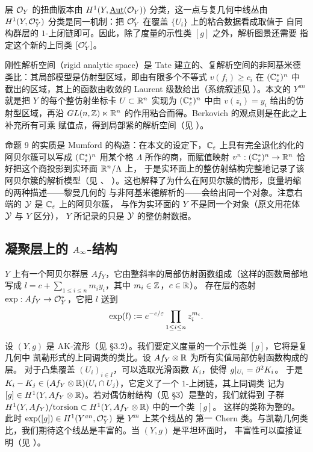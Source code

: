 \begin{yizhu}[扭曲层与第一非阿贝尔上同调]
层 $\mathcal{O}_Y$ 的扭曲版本由 $H^1(Y,\underline{\operatorname{Aut}}(\mathcal{O}_Y))$ 分类，这一点与复几何中线丛由
$H^1(Y,\mathcal{O}_Y^*)$ 分类是同一机制：把 $\mathcal{O}'_Y$ 在覆盖 $\{U_i\}$ 上的粘合数据看成取值于
自同构群层的 $1$-上闭链即可。因此，除了度量的示性类 $[g]$ 之外，解析图景还需要
指定这个新的上同类 $[\mathcal{O}'_Y]$。
\end{yizhu}

\begin{yizhu}[刚性解析空间与赋值]
刚性解析空间（rigid analytic space）是 Tate 建立的、复解析空间的非阿基米德
类比：其局部模型是仿射型区域，即由有限多个不等式 $v(f_i)\ge c_i$ 在
$(\mathbb{C}_{\varepsilon}^*)^n$ 中截出的区域，其上的函数由收敛的 Laurent 级数给出（系统叙述见
\cite{BGR}）。本文的 $Y^{an}$ 就是把 $Y$ 的每个整仿射坐标卡 $U\subset\mathbb{R}^n$ 实现为
$(\mathbb{C}_{\varepsilon}^*)^n$ 中由 $v(z_i)=y_i$ 给出的仿射型区域，再沿
$GL(n,\mathbb{Z})\ltimes\mathbb{R}^n$ 的作用粘合而得。Berkovich 的观点则是在此之上补充所有可乘
赋值点，得到局部紧的解析空间（见 \cite{Be}）。
\end{yizhu}

\begin{yizhu}[命题 9 的含义]
命题 9 的实质是 Mumford 的构造：在本文的设定下，$\mathbb{C}_{\varepsilon}$ 上具有完全退化约化的
阿贝尔簇可以写成 $(\mathbb{C}_{\varepsilon}^*)^n$ 用某个格 $\Lambda$ 所作的商，而赋值映射
$v^n:(\mathbb{C}_{\varepsilon}^*)^n\to\mathbb{R}^n$ 恰好把这个商投影到实环面 $\mathbb{R}^n/\Lambda$ 上，
于是实环面上的整仿射结构完整地记录了该阿贝尔簇的解析模型（见 \cite{Mum}、
\cite{BL}）。这也解释了为什么在阿贝尔簇的情形，度量坍缩的两种描述——黎曼几何的
与非阿基米德解析的——会给出同一个对象。注意右端的 $\mathcal{Y}$ 是 $\mathbb{C}_{\varepsilon}$ 上的阿贝尔簇，
与作为实环面的 $Y$ 不是同一个对象（原文用花体 $\mathcal{Y}$ 与 $Y$ 区分），
$Y$ 所记录的只是 $\mathcal{Y}$ 的整仿射数据。
\end{yizhu}

\subsection{凝聚层上的 \texorpdfstring{$A_{\infty}$}{A∞}-结构}

$Y$ 上有一个阿贝尔群层 $Af_Y$，它由整斜率的局部仿射函数组成（这样的函数局部地
写成 $l=c+\sum_{1\le i\le n}m_i y_i$，其中 $m_i\in\mathbb{Z}$，$c\in\mathbb{R}$）。
存在层的态射 $\exp:Af_Y\to\mathcal{O}_Y^*$，它把 $l$ 送到
\[
  \exp(l):=e^{-c/\varepsilon}\prod_{1\le i\le n}z_i^{m_i}.
\]


设 $(Y,g)$ 是 AK-流形（见 §3.2）。我们要定义度量的一个示性类 $[g]$，它将是复几何中
凯勒形式的上同调类的类比。设 $Af_Y\otimes\mathbb{R}$ 为所有实值局部仿射函数构成的层。
对于凸集覆盖 $(U_i)_{i\in I}$，可以选取光滑函数 $K_i$，使得 $g|_{U_i}=\partial^2K_i$。
于是 $K_i-K_j\in(Af_Y\otimes\mathbb{R})(U_i\cap U_j)$，它定义了一个 $1$-上闭链，其上同调类
记为 $[g]\in H^1(Y,Af_Y\otimes\mathbb{R})$。若对偶仿射结构（见 §3）是整的，我们就得到
子群 $H^1(Y,Af_Y)/\mathrm{torsion}\subset H^1(Y,Af_Y\otimes\mathbb{R})$ 中的一个类 $[g]$。
这样的类称为整的。此时 $\exp([g])\in H^1(Y^{an},\mathcal{O}_Y^*)$ 是 $Y^{an}$ 上某个线丛的
第一 Chern 类。与凯勒几何类比，我们期待这个线丛是丰富的。当 $(Y,g)$ 是平坦环面时，
丰富性可以直接证明（见 \cite{BL}）。

